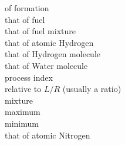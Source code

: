 \begin{tabbing}
                                      \> of formation                                                                                                                             \\
                 \> that of fuel                                                                                                                             \\
              \> that of fuel mixture                                                                                                                     \\
            \> that of atomic Hydrogen                                                                                                                  \\
           \> that of Hydrogen molecule                                                                                                                \\
          \> that of Water molecule                                                                                                                   \\
                                      \> process index                                                                                                                            \\
                                   \> relative to $L/R$ (usually a ratio)                                                                                                      \\
                                      \> mixture                                                                                                                                  \\
                                  \> maximum                                                                                                                                  \\
                                  \> minimum                                                                                                                                  \\
            \> that of atomic Nitrogen                                                                                                                  \\

\end{tabbing}

